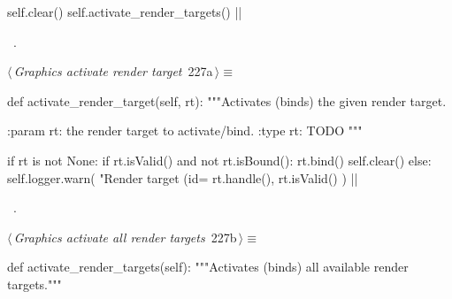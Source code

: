 \documentclass[%
    a4paper,    %
    justified,  %
    nobib,      %
    openany     %
]{tufte-book}
\makeatletter
\renewcommand{\label}[1]{\@tufte@label{##1}}%
\makeatother
\begin{document}
\begin{fullwidth}
\begin{flushleft}
\begin{minipage}{\linewidth}
\begin{pythoncode}
    self.clear()
    self.activate_render_targets()
|\NWsep|
\end{pythoncode}
\vspace{1.5ex}
\footnotesize
\begin{list}{}{\setlength{\itemsep}{-\parsep}\setlength{\itemindent}{-\leftmargin}}
\item \NWtxtMacroRefIn\ .

\item{}
\end{list}
\end{minipage}\vspace{4ex}
\end{flushleft}
\begin{flushleft} \small
\begin{minipage}{\linewidth}\label{scrap236}\raggedright\small
{} $\langle\,${\itshape Graphics activate render target}\nobreak\ {\footnotesize {227a}}$\,\rangle\equiv$
\vspace{-1ex}
\begin{pythoncode}
def activate_render_target(self, rt):
    """Activates (binds) the given render target.

    :param rt: the render target to activate/bind.
    :type rt:  TODO
    """

    if rt is not None:
        if rt.isValid() and not rt.isBound():
            rt.bind()
            self.clear()
        else:
            self.logger.warn(
                "Render target (id=%
                rt.handle(), rt.isValid()
            )
|\NWsep|
\end{pythoncode}
\vspace{1.5ex}
\footnotesize
\begin{list}{}{\setlength{\itemsep}{-\parsep}\setlength{\itemindent}{-\leftmargin}}
\item \NWtxtMacroRefIn\ .

\item{}
\end{list}
\end{minipage}\vspace{4ex}
\end{flushleft}
\begin{flushleft} \small
\begin{minipage}{\linewidth}\label{scrap237}\raggedright\small
{} $\langle\,${\itshape Graphics activate all render targets}\nobreak\ {\footnotesize {227b}}$\,\rangle\equiv$
\vspace{-1ex}
\begin{pythoncode}
def activate_render_targets(self):
    """Activates (binds) all available render targets."""


\end{pythoncode}
\end{minipage}
\end{flushleft}
\end{fullwidth}
\end{document}
